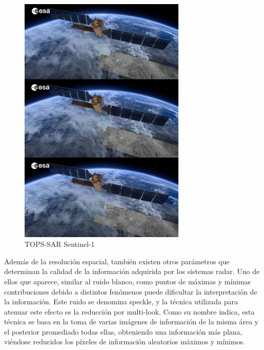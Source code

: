 \begin{figure}[h]
    \centering
    \includegraphics[height=12cm]{archivos/tfg/imgbarrido} %
    \caption{TOPS-SAR Sentinel-1 \cite{yts1}}
    \label{fig:sarb}
\end{figure}

\par Además de la resolución espacial, también existen otros parámetros que determinan la calidad de la información adquirida por los sistemas radar. Uno de ellos que aparece, similar al ruido blanco, como puntos de máximas y mínimas contribuciones debido a distintos fenómenos puede dificultar la interpretación de la información. Este ruido se denomina speckle, y la técnica utilizada para atenuar este efecto es la reducción por multi-look. Como su nombre indica, esta técnica se basa en la toma de varias imágenes de información de la misma área y el posterior promediado todas ellas, obteniendo una información más plana, viéndose reducidos los píxeles de información aleatorios máximos y mínimos. 

